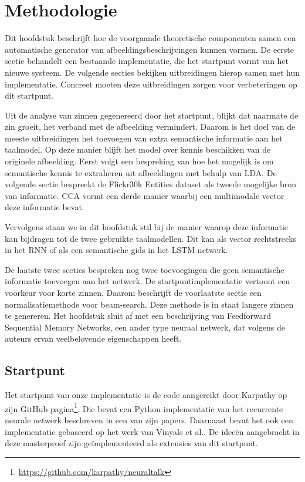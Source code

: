 \chapter{Methodologie}
\label{hst-meth}
Dit hoofdstuk beschrijft hoe de voorgaande theoretische componenten samen een automatische generator van afbeeldingsbeschrijvingen kunnen vormen. De eerste sectie behandelt een bestaande implementatie, die het startpunt vormt van het nieuwe systeem. De volgende secties bekijken uitbreidingen hierop samen met hun implementatie. Concreet moeten deze uitbreidingen zorgen voor verbeteringen op dit startpunt.

Uit de analyse van zinnen gegenereerd door het startpunt, blijkt dat naarmate de zin groeit, het verband met de afbeelding vermindert. Daarom is het doel van de meeste uitbreidingen het toevoegen van extra semantische informatie aan het taalmodel. Op deze manier blijft het model over kennis beschikken van de originele afbeelding. Eerst volgt een bespreking van hoe het mogelijk is om semantische kennis te extraheren uit afbeeldingen met behulp van LDA. De volgende sectie bespreekt de Flickr30k Entities dataset als tweede mogelijke bron van informatie. CCA vormt een derde manier waarbij een multimodale vector deze informatie bevat.

Vervolgens staan we in dit hoofdstuk stil bij de manier waarop deze informatie kan bijdragen tot de twee gebruikte taalmodellen. Dit kan als vector rechtstreeks in het RNN of als een semantische gids in het LSTM-netwerk. 

De laatste twee secties bespreken nog twee toevoegingen die geen semantische informatie toevoegen aan het netwerk. De startpuntimplementatie vertoont een voorkeur voor korte zinnen. Daarom beschrijft de voorlaatste sectie een normalisatiemethode voor beam-search. Deze methode is in staat langere zinnen te genereren. Het hoofdstuk sluit af met een beschrijving van Feedforward Sequential Memory Networks, een ander type neuraal netwerk, dat volgens de auteurs ervan veelbelovende eigenschappen heeft.


\section{Startpunt}
Het startpunt van onze implementatie is de code aangereikt door Karpathy op zijn GitHub pagina\footnote{\url{https://github.com/karpathy/neuraltalk}}. Die bevat een Python implementatie van het recurrente neurale netwerk beschreven in een van zijn papers\cite{Karpathy2015}. Daarnaast bevat het ook een implementatie gebaseerd op het werk van Vinyals et al.\cite{Google}. De idee\"en aangebracht in deze masterproef zijn ge\"implementeerd als extensies van dit startpunt.

